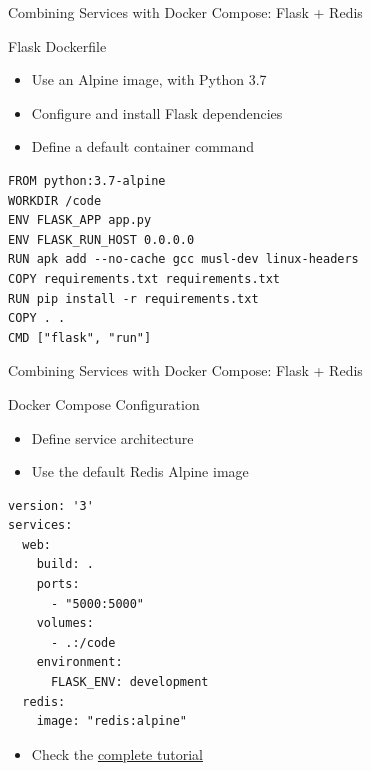 \documentclass[10pt, compress, aspectratio=169, xcolor={table,usenames,dvipsnames}]{beamer}
\begin{document}
\begin{frame}[label={sec:org349df3b},fragile]{Combining Services with Docker Compose: Flask + Redis}
 \begin{block}{Flask Dockerfile}
\begin{itemize}
\item Use an Alpine image, with Python 3.7
\item Configure and install \alert{Flask} dependencies
\item Define a default \alert{container command}
\end{itemize}

\lstset{language=dockerfile,label= ,caption= ,captionpos=b,numbers=none}
\begin{lstlisting}
FROM python:3.7-alpine
WORKDIR /code
ENV FLASK_APP app.py
ENV FLASK_RUN_HOST 0.0.0.0
RUN apk add --no-cache gcc musl-dev linux-headers
COPY requirements.txt requirements.txt
RUN pip install -r requirements.txt
COPY . .
CMD ["flask", "run"]
\end{lstlisting}
\end{block}
\end{frame}

\begin{frame}[label={sec:orgc307325},fragile]{Combining Services with Docker Compose: Flask + Redis}
 \begin{block}{Docker Compose Configuration}
\begin{itemize}
\item Define \alert{service architecture}
\item Use the \alert{default} Redis Alpine image
\end{itemize}

\lstset{language=yaml,label= ,caption= ,captionpos=b,numbers=none}
\begin{lstlisting}
version: '3'
services:
  web:
    build: .
    ports:
      - "5000:5000"
    volumes:
      - .:/code
    environment:
      FLASK_ENV: development
  redis:
    image: "redis:alpine"
\end{lstlisting}

\begin{itemize}
\item Check the \href{https://docs.docker.com/compose/gettingstarted/}{complete tutorial}
\end{itemize}
\end{block}
\end{frame}
\end{document}
